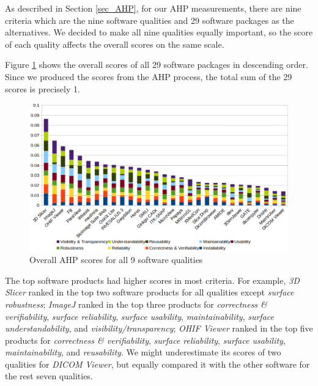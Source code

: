 As described in Section \ref{sec_AHP}, for our AHP measurements, there are nine criteria which are the nine software qualities and 29 software packages as the alternatives. We decided to make all nine qualities equally important, so the score of each quality affects the overall scores on the same scale.

Figure \ref{fg_overall_scores} shows the overall scores of all 29 software packages in descending order. Since we produced the scores from the AHP process, the total sum of the 29 scores is precisely 1.

\begin{figure}[H]
\includegraphics[scale=0.38]{figures/overall_scores.png}
\caption{Overall AHP scores for all 9 software qualities}

\label{fg_overall_scores}
\end{figure}

The top software products had higher scores in most criteria. For example, \textit{3D Slicer} ranked in the top two software products for all qualities except \textit{surface robustness}; \textit{ImageJ} ranked in the top three products for \textit{correctness \& verifiability}, \textit{surface reliability}, \textit{surface usability}, \textit{maintainability}, \textit{ surface understandability}, and \textit{visibility/transparency}; \textit{OHIF Viewer} ranked in the top five products for \textit{correctness \& verifiability}, \textit{surface reliability}, \textit{surface usability}, \textit{maintainability}, and \textit{reusability}. We might underestimate its scores of two qualities for \textit{DICOM Viewer}, but equally compared it with the other software for the rest seven qualities.
